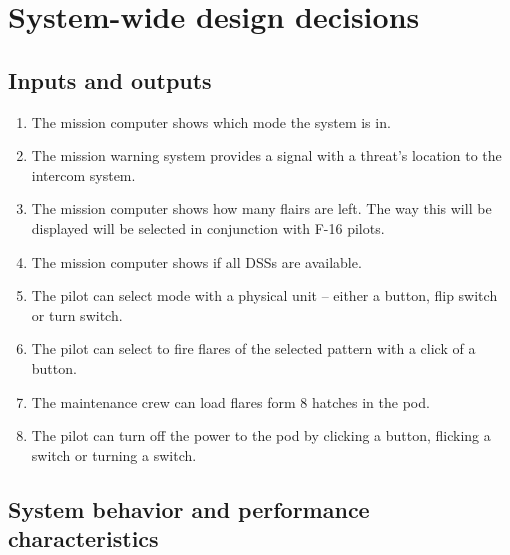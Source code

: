 \documentclass[Main]{subfiles}
\begin{document}
\chapter{System-wide design decisions}


\section{Inputs and outputs}

\begin{enumerate}[label= DDD-1.\arabic*:]

\item The mission computer shows which mode the system is in. \label{DDD-11}

\item The mission warning system provides a signal with a threat's location to the intercom system.\label{DDD-12}

\item The mission computer shows how many flairs are left.
The way this will be displayed will be selected in conjunction with F-16 pilots. \label{DDD-13}

\item The mission computer shows if all DSSs are available.\label{DDD-14}

\item The pilot can select mode with a physical unit -- either a button, flip switch or turn switch.\label{DDD-15}

\item The pilot can select to fire flares of the selected pattern with a click of a button.\label{DDD-16}

\item The maintenance crew can load flares form 8 hatches in the pod.\label{DDD-17}

\item The pilot can turn off the power to the pod by clicking a button, flicking a switch or turning a switch.\label{DDD-18}

\end{enumerate}




\section{System behavior and performance characteristics}
\end{document}

